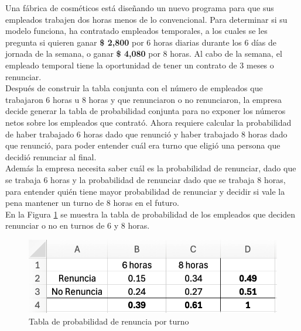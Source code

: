\documentclass{article}
\begin{document}
Una fábrica de cosméticos está diseñando un nuevo programa para que sus empleados trabajen dos horas menos de lo convencional. Para determinar si su modelo funciona, ha contratado empleados temporales, a los cuales se les pregunta si quieren ganar \textbf{\$ 2,800} por 6 horas diarias durante los 6 días de jornada de la semana, o ganar \textbf{\$ 4,080} por 8 horas. Al cabo de la semana, el empleado temporal tiene la oportunidad de tener un contrato de 3 meses o renunciar.
\\[12pt]
Después de construir la tabla conjunta con el número de empleados que trabajaron 6 horas u 8 horas y que renunciaron o no renunciaron, la empresa decide generar la tabla de probabilidad conjunta para no exponer los números netos sobre los empleados que contrató. Ahora requiere calcular la probabilidad de haber trabajado 6 horas dado que renunció y haber trabajado 8 horas dado que renunció, para poder entender cuál era turno que eligió una persona que decidió renunciar al final.
\\[12pt]
Además la empresa necesita saber cuál es la probabilidad de renunciar, dado que se trabaja 6 horas y la probabilidad de renunciar dado que se trabaja 8 horas, para entender quién tiene mayor probabilidad de renunciar y decidir si vale la pena mantener un turno de 8 horas en el futuro.
\\[12pt]
En la Figura \ref{fig:p204} se muestra la tabla de probabilidad de los empleados que deciden renunciar o no en turnos de 6 y 8 horas.
\begin{figure}[!h]
    \centering
    \begin{minipage}{\textwidth}
        \centering
        \includegraphics[width=\textwidth]{figures/p204.png}
    \end{minipage}
    \captionsetup{width=0.9\textwidth}
    \caption{Tabla de probabilidad de renuncia por turno}
    \label{fig:p204}
\end{figure}
\\
\end{document}
